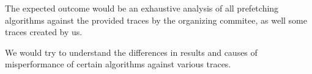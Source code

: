 
The expected outcome would be an exhaustive analysis of all prefetching algorithms against the provided
traces by the organizing commitee, as well some traces created by us.

\noindent We would try to understand the differences in results and causes of misperformance of certain algorithms
against various traces.